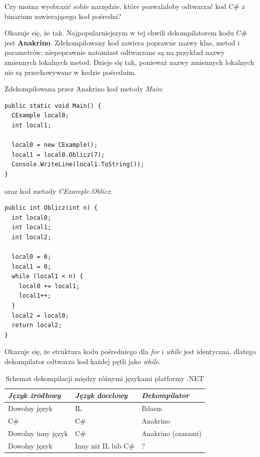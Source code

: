Czy można wyobrazić sobie narzędzie, które pozwalałoby odtwarzać kod C\# z binarium zawierającego kod pośredni?

Okazuje się, że tak. Najpopularniejszym w tej chwili dekompilatorem kodu C\# jest
{\bf Anakrino}. Zdekompilowany kod zawiera poprawne nazwy klas, metod i parametrów, niepoprawnie natomiast
odtwarzane są na przykład nazwy zmiennych lokalnych metod. Dzieje się tak, ponieważ nazwy zmiennych lokalnych
nie są przechowywane w kodzie pośrednim.

Zdekompilowana przez Anakrino kod metody {\em Main}:

\begin{scriptsize}
\begin{verbatim}
public static void Main() {
  CExample local0;
  int local1;

  local0 = new CExample();
  local1 = local0.Oblicz(7);
  Console.WriteLine(local1.ToString());
}
\end{verbatim}
\end{scriptsize}

oraz kod metody {\em CExample.Oblicz}:

\begin{scriptsize}
\begin{verbatim}
public int Oblicz(int n) {
  int local0;
  int local1;
  int local2;

  local0 = 0;
  local1 = 0;
  while (local1 < n) {
    local0 += local1;
    local1++;
  }
  local2 = local0;
  return local2;
}
\end{verbatim}
\end{scriptsize}

Okazuje się, że struktura kodu pośredniego dla {\em for} i {\em while} jest identyczna, 
dlatego dekompilator odtwarza kod każdej pętli jako {\em while}.

\begin{table}
\begin{center}
\begin{tabular}{lll} 
{\em Język źródłowy} & {\em Język docelowy} & {\em Dekompilator} \\ \hline \hline
Dowolny język & IL & Ildasm \\ \hline
C\# & C\# & Anakrino \\
Dowolny inny język & C\# & Anakrino (czasami) \\ \hline
Dowolny język & Inny niż IL lub C\# & ? \\
\end{tabular}
\caption{Schemat dekompilacji między różnymi językami platformy .NET}
\end{center}
\end{table}

